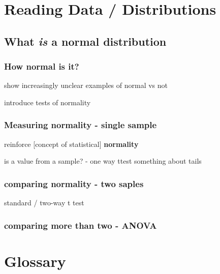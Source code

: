 \documentclass[
]{book}
\begin{document}
\hypertarget{reading-data-distributions}{%
\section{Reading Data / Distributions}\label{reading-data-distributions}}

\hypertarget{what-is-a-normal-distribution}{%
\subsection{\texorpdfstring{What \emph{is} a \textbf{normal distribution}}{What is a normal distribution}}\label{what-is-a-normal-distribution}}

\hypertarget{how-normal-is-it}{%
\subsubsection{How normal is it?}\label{how-normal-is-it}}

show increasingly unclear examples of normal vs not

introduce tests of normality

\hypertarget{measuring-normality---single-sample}{%
\subsubsection{Measuring normality - single sample}\label{measuring-normality---single-sample}}

reinforce {[}concept of statistical{]} \textbf{normality}

is a value from a sample? - one way ttest
something about tails

\hypertarget{comparing-normality---two-saples}{%
\subsubsection{comparing normality - two saples}\label{comparing-normality---two-saples}}

standard / two-way t test

\hypertarget{comparing-more-than-two---anova}{%
\subsubsection{comparing more than two - ANOVA}\label{comparing-more-than-two---anova}}

\hypertarget{glossary-1}{%
\section{Glossary}\label{glossary-1}}
\end{document}
